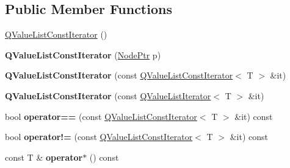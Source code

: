 \subsection*{Public Member Functions}
\begin{DoxyCompactItemize}
\item 
\mbox{\hyperlink{class_q_value_list_const_iterator_adc6d0a8fab8a6d737806fdee6537ac61}{Q\+Value\+List\+Const\+Iterator}} ()
\item 
\mbox{\label{class_q_value_list_const_iterator_a5b5e0445e43be3c76047d39e314a97d2}} 
{\bfseries Q\+Value\+List\+Const\+Iterator} (\mbox{\hyperlink{class_q_value_list_const_iterator_a2416aa81d7180a7e83fd7ddc334ec5d1}{Node\+Ptr}} p)
\item 
\mbox{\label{class_q_value_list_const_iterator_a3266d20d3b41cdd6a5bccec0c313121e}} 
{\bfseries Q\+Value\+List\+Const\+Iterator} (const \mbox{\hyperlink{class_q_value_list_const_iterator}{Q\+Value\+List\+Const\+Iterator}}$<$ T $>$ \&it)
\item 
\mbox{\label{class_q_value_list_const_iterator_a364e64002620ddb7946fa3f0a172b4c1}} 
{\bfseries Q\+Value\+List\+Const\+Iterator} (const \mbox{\hyperlink{class_q_value_list_iterator}{Q\+Value\+List\+Iterator}}$<$ T $>$ \&it)
\item 
\mbox{\label{class_q_value_list_const_iterator_a0694a21f2448f80d4d76c0beba5f91b3}} 
bool {\bfseries operator==} (const \mbox{\hyperlink{class_q_value_list_const_iterator}{Q\+Value\+List\+Const\+Iterator}}$<$ T $>$ \&it) const
\item 
\mbox{\label{class_q_value_list_const_iterator_ae361f8dd3559d768f8a73f01609df0d2}} 
bool {\bfseries operator!=} (const \mbox{\hyperlink{class_q_value_list_const_iterator}{Q\+Value\+List\+Const\+Iterator}}$<$ T $>$ \&it) const
\item 
\mbox{\label{class_q_value_list_const_iterator_aba948f684cc9da8f19f47e2039fac71a}} 
const T \& {\bfseries operator$\ast$} () const
\item 
\mbox{\label{class_q_value_list_const_iterator_af7b222211b620d4bf54e7a6768de3129}} 

\end{DoxyCompactItemize}

